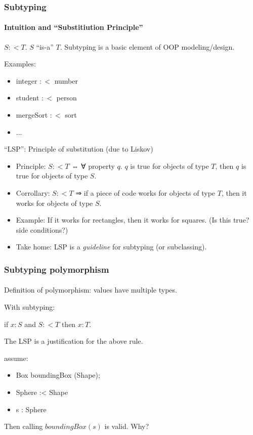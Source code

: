 \documentclass{beamer}
\begin{document}
\begin{frame}[fragile]
\frametitle{Subtyping}
\framesubtitle{Intuition and ``Substitiution Principle''}


$S :< T$. $S$ ``is-a'' $T$. 
Subtyping is a basic element of OOP modeling/design.

Examples: 

\begin{itemize}
  \item integer $:<$ number
  \item student $:<$ person
  \item mergeSort $:<$ sort
  \item ...
\end{itemize}

``LSP'': Principle of substitution (due to Liskov)
\begin{itemize}
  \item Principle: $S :< T$ ⇔ ∀ property $q$. $q$ is true for objects of type $T$, then $q$ is true for objects of type $S$.
  \item Corrollary: $S :< T$ ⇒ if a piece of code works for objects of type $T$, then it works for objects of type $S$.
  \item Example: If it works for rectangles, then it works for squares. (Is this true? side conditions?)
  \item Take home: LSP is a \emph{guideline} for subtyping (or subclassing).
\end{itemize}

\end{frame}


\begin{frame}
\frametitle{Subtyping polymorphism}
\framesubtitle{}

Definition of polymorphism: values have multiple types.

With subtyping:

if $x : S$ and $S :< T$ then $x : T$.

The LSP is a justification for the above rule.

\begin{example}
  assume: 
  \begin{itemize}
  \item Box boundingBox (Shape);
  \item Sphere :< Shape
  \item s : Sphere
  \end{itemize}
  Then calling $boundingBox(s)$ is valid. Why?  
\end{example}

\end{frame}
\end{document}
